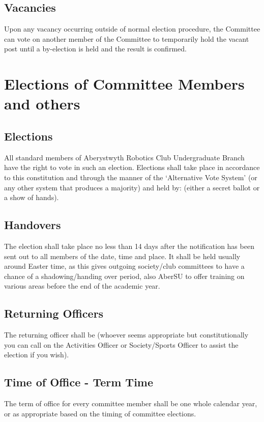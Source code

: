 \documentclass[a4paper,11pt]{article}
\begin{document}
\subsection{Vacancies}
Upon any vacancy occurring outside of normal election procedure, the Committee can vote on another member of the Committee to temporarily hold the vacant post until a by-election is held and the result is confirmed.

\newpage
\section{Elections of Committee Members and others}
\subsection{Elections}
All standard members of Aberystwyth Robotics Club Undergraduate Branch have the right to vote in such an election. Elections shall take place in accordance to this constitution and through the manner of the `Alternative Vote System' (or any other system that produces a majority) and held by: (either a secret ballot or a show of hands).

\subsection{Handovers}
The election shall take place no less than 14 days after the notification has been sent out to all members of the date, time and place. It shall be held usually around Easter time, as this gives outgoing society/club committees to have a chance of a shadowing/handing over period, also AberSU to offer training on various areas before the end of the academic year.

\subsection{Returning Officers}
The returning officer shall be (whoever seems appropriate but constitutionally you can call on the Activities Officer or Society/Sports Officer to assist the election if you wish).

\subsection{Time of Office - Term Time}
The term of office for every committee member shall be one whole calendar year, or as appropriate based on the timing of committee elections.
\end{document}
